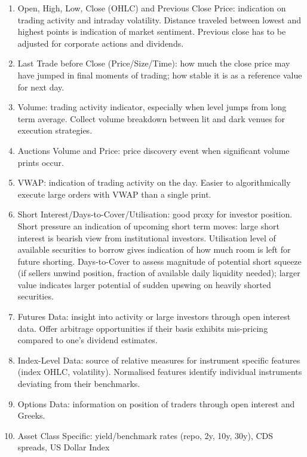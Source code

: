 \documentclass[a4paper,oneside,openany]{book}
\begin{document}
\begin{definition} 
\begin{enumerate}[label=\roman*.]
\setlength{\itemsep}{0pt}
\item Open, High, Low, Close (OHLC) and Previous Close Price: indication on trading activity and intraday volatility. Distance traveled between lowest and highest points is indication of market sentiment. Previous close has to be adjusted for corporate actions and dividends.
\item Last Trade before Close (Price/Size/Time): how much the close price may have jumped in final moments of trading; how stable it is as a reference value for next day.
\item Volume: trading activity indicator, especially when level jumps from long term average. Collect volume breakdown between lit and dark venues for execution strategies.
\item Auctions Volume and Price: price discovery event when significant volume prints occur.
\item VWAP: indication of trading activity on the day. Easier to algorithmically execute large orders with VWAP than a single print.
\item Short Interest/Days-to-Cover/Utilisation: good proxy for investor position. Short pressure an indication of upcoming short term moves: large short interest is bearish view from institutional investors. Utilisation level of available securities to borrow gives indication of how much room is left for future shorting. Days-to-Cover to assess magnitude of potential short squeeze (if sellers unwind position, fraction of available daily liquidity needed); larger value indicates larger potential of sudden upswing on heavily shorted securities.
\item Futures Data: insight into activity or large investors through open interest data. Offer arbitrage opportunities if their basis exhibits mis-pricing compared to one's dividend estimates.
\item Index-Level Data: source of relative measures for instrument specific features (index OHLC, volatility). Normalised features identify individual instruments deviating from their benchmarks.
\item Options Data: information on position of traders through open interest and Greeks.
\item Asset Class Specific: yield/benchmark rates (repo, 2y, 10y, 30y), CDS spreads, US Dollar Index
\end{enumerate}
\end{definition}
\end{document}
